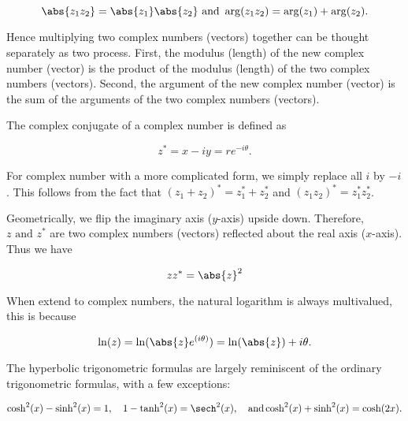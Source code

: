 \documentclass[english,a4paper,12pt]{report}
\begin{document}
\begin{equation}
	\abs{z_1 z_2 } = \abs{z_1 }\abs{z_2 } \text { and } \arg (z_1 z_2 ) = \arg (z_1 ) + \arg (z_2 ).
\end{equation}

Hence multiplying two complex numbers (vectors) together can be thought separately as two process. First, the modulus (length) of the new complex number (vector) is the product of the modulus (length) of the two complex numbers (vectors). Second, the argument of the new complex number (vector) is the sum of the arguments of the two complex numbers (vectors).

The complex conjugate of a complex number is defined as 

\begin{equation}
	z^* = x-iy = re^{-i \theta }.
\end{equation}

For complex number with a more complicated form, we simply replace all \(i\) by \(-i\). This follows from the fact that \((z_1 + z_2 )^* = z_1 ^* + z_2 ^*\) and \((z_1 z_2 )^* = z_1 ^* z_2 ^*\).  

Geometrically, we flip the imaginary axis (\(y\)-axis) upside down. Therefore, \(z \text { and } z^*\) are two complex numbers (vectors) reflected about the real axis (\(x\)-axis). Thus we have

\begin{equation}
	z z^* = \abs{z}^2 
\end{equation}

When extend to complex numbers, the natural logarithm is always multivalued, this is because 

\begin{equation}
    \ln (z) = \ln (\abs{z}e^{(i \theta )}  ) = \ln (\abs{z} ) + i \theta .
\end{equation}

The hyperbolic trigonometric formulas are largely reminiscent of the ordinary trigonometric formulas, with a few exceptions:

\begin{equation}
    \cosh^2(x) - \sinh^2(x) = 1, \quad 1 - \tanh^2(x) = \sech^2(x), \quad \text{and} \cosh^2(x) + \sinh^2(x) = \cosh(2x).
\end{equation}
\end{document}
